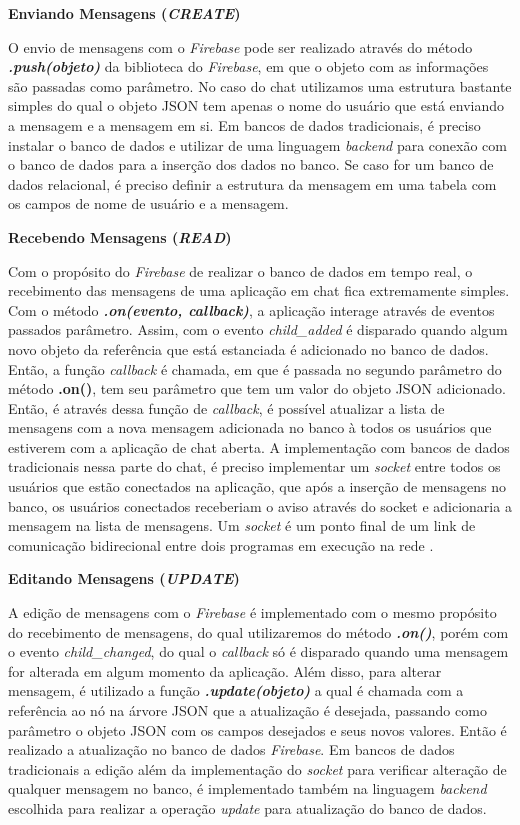 \documentclass[12pt]{article}
\begin{document}
\textbf{Enviando Mensagens (\textit{CREATE})}

O envio de mensagens com o \textit{Firebase} pode ser realizado através do método \textit{\textbf{.push(objeto)}} da biblioteca do \textit{Firebase}, em que o objeto com as informações são passadas como parâmetro. No caso do chat utilizamos uma estrutura bastante simples do qual o objeto JSON tem apenas o nome do usuário que está enviando a mensagem e a mensagem em si. Em bancos de dados tradicionais, é preciso instalar o banco de dados e utilizar de uma linguagem \textit{backend} para conexão com o banco de dados para a inserção dos dados no banco. Se caso for um banco de dados relacional, é preciso definir a estrutura da mensagem em uma tabela com os campos de nome de usuário e a mensagem.

\textbf{Recebendo Mensagens (\textit{READ})}

Com o propósito do \textit{Firebase} de realizar o banco de dados em tempo real, o recebimento das mensagens de uma aplicação em chat fica extremamente simples. Com o método \textit{\textbf{.on(evento, callback)}}, a aplicação interage através de eventos passados parâmetro. Assim, com o evento \textit{child\_added} é disparado quando algum novo objeto da referência que está estanciada é adicionado no banco de dados. Então, a função \textit{callback} é chamada, em que é passada no segundo parâmetro do método \textbf{.on()}, tem seu parâmetro que tem um valor do objeto JSON adicionado. Então, é através dessa função de \textit{callback}, é possível atualizar a lista de mensagens com a nova mensagem adicionada no banco à todos os usuários que estiverem com a aplicação de chat aberta. A implementação com bancos de dados tradicionais nessa parte do chat, é preciso implementar um \textit{socket} entre todos os usuários que estão conectados na aplicação, que após a inserção de mensagens no banco, os usuários conectados receberiam o aviso através do socket e adicionaria a mensagem na lista de mensagens. Um \textit{socket} é um ponto final de um link de comunicação bidirecional entre dois programas em execução na rede \cite{socket}.

\textbf{Editando Mensagens (\textit{UPDATE})}

A edição de mensagens com o \textit{Firebase} é implementado com o mesmo propósito do recebimento de mensagens, do qual utilizaremos do método \textit{\textbf{.on()}}, porém com o evento \textit{child\_changed}, do qual o \textit{callback} só é disparado quando uma mensagem for alterada em algum momento da aplicação. Além disso, para alterar mensagem, é utilizado a função \textit{\textbf{.update(objeto)}} a qual é chamada com a referência ao nó na árvore JSON que a atualização é desejada, passando como parâmetro o objeto JSON com os campos desejados e seus novos valores. Então é realizado a atualização no banco de dados \textit{Firebase}. Em bancos de dados tradicionais a edição além da implementação do \textit{socket} para verificar alteração de qualquer mensagem no banco, é implementado também na linguagem \textit{backend} escolhida para realizar a operação \textit{update} para atualização do banco de dados.
\end{document}
